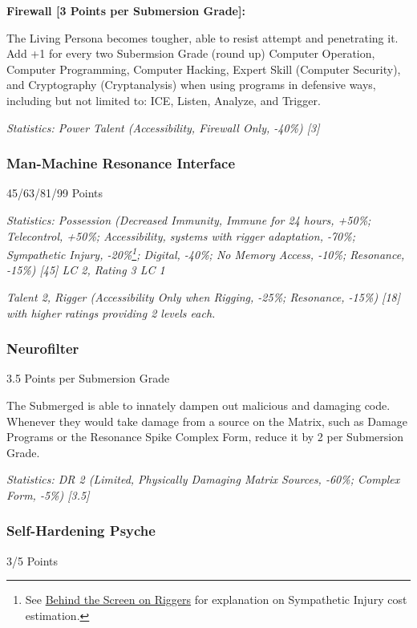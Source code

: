 \begin{multicols*}{3}
	\textbf{Firewall [3 Points per Submersion Grade]:}
	
	The Living Persona becomes tougher, able to resist attempt and penetrating it. Add +1 for every two Subermsion Grade (round up) Computer Operation, Computer Programming, Computer Hacking, Expert Skill (Computer Security), and Cryptography (Cryptanalysis) when using programs in defensive ways, including but not limited to: ICE, Listen, Analyze, and Trigger.
	
	\textcolor{OliveGreen}{\textit{Statistics: Power Talent (Accessibility, Firewall Only, -40\%) [3] }}
	
	\subsubsection{Man-Machine Resonance Interface}
	\begin{flushright}
		45/63/81/99 Points
	\end{flushright}
	
	
	\textit{\textcolor{OliveGreen}{Statistics: Possession (Decreased Immunity, Immune for 24 hours, +50\%; Telecontrol, +50\%; Accessibility, systems with rigger adaptation, -70\%; Sympathetic Injury, -20\%\footnote{See \hyperref[bts_riggers]{Behind the Screen on Riggers} for explanation on Sympathetic Injury cost estimation.}; Digital, -40\%; No Memory Access, -10\%; Resonance, -15\%) [45] LC 2, Rating 3 LC 1}}
	
	\textit{\textcolor{OliveGreen}{Talent 2, Rigger (Accessibility  Only when Rigging, -25\%; Resonance, -15\%) [18] with higher ratings providing 2 levels each.}}
	
	\subsubsection{Neurofilter}
	\begin{flushright}
		3.5 Points per Submersion Grade
	\end{flushright}

	The Submerged is able to innately dampen out malicious and damaging code. Whenever they would take damage from a source on the Matrix, such as Damage Programs or the Resonance Spike Complex Form, reduce it by 2 per Submersion Grade.
	
	\textit{\textcolor{OliveGreen}{Statistics: DR 2 (Limited, Physically Damaging Matrix Sources, -60\%; Complex Form, -5\%) [3.5] }}
		
	\subsubsection{Self-Hardening Psyche}
	\begin{flushright}
		3/5 Points
	\end{flushright}	
	

\end{multicols*}
